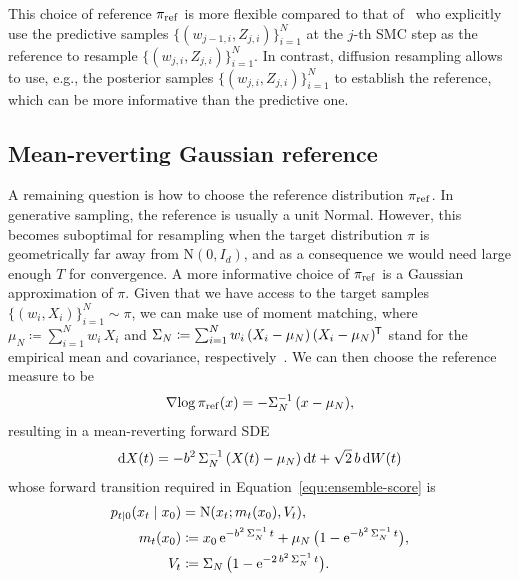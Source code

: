 \documentclass{article}
\begin{document}
This choice of reference $\pi_{\mathrm{ref}}$ is more flexible compared to that of~\citet{Corenflos2021} who explicitly use the predictive samples $\lbrace (w_{j-1, i}, Z_{j, i})\rbrace_{i=1}^N$ at the $j$-th SMC step as the reference to resample $\lbrace (w_{j, i}, Z_{j, i})\rbrace_{i=1}^N$. 
In contrast, diffusion resampling allows to use, e.g., the posterior samples $\lbrace (w_{j, i}, Z_{j, i})\rbrace_{i=1}^N$ to establish the reference, which can be more informative than the predictive one. 

\subsection{Mean-reverting Gaussian reference}
\label{sec:ref-distribution}
A remaining question is how to choose the reference distribution $\pi_{\mathrm{ref}}$.
In generative sampling, the reference is usually a unit Normal. 
However, this becomes suboptimal for resampling when the target distribution $\pi$ is geometrically far away from $\mathrm{N}(0, I_d)$, and as a consequence we would need large enough $T$ for convergence. 
A more informative choice of $\pi_{\mathrm{ref}}$ is a Gaussian approximation of $\pi$. 
Given that we have access to the target samples $\lbrace (w_i, X_i) \rbrace_{i=1}^N \sim \pi$, we can make use of moment matching, where $\mu_N \coloneqq \sum_{i=1}^N w_i \, X_i$ and $\Sigma_N \coloneqq \sum_{i=1}^N w_i \, (X_i - \mu_N) \, (X_i - \mu_N)^{\mkern-1.5mu\mathsf{T}}$ stand for the empirical mean and covariance, respectively~\citep{Yang2013, Kang2025}. 
We can then choose the reference measure to be
%
\begin{equation}
    \begin{split}
        \operatorname{\nabla\!}\log \pi_{\mathrm{ref}}(x) = -\Sigma_N^{-1} \, (x - \mu_N), 
    \end{split}
\end{equation}
%
resulting in a mean-reverting forward SDE
%
\begin{equation}
    \begin{split}
        \mathop{}\!\mathrm{d} X(t) = -b^2 \, \Sigma_N^{-1} \, (X(t) - \mu_N) \mathop{}\!\mathrm{d} t + \sqrt{2} \, b \mathop{}\!\mathrm{d} W(t)
    \end{split}
    \label{equ:gaussian-fwd}
\end{equation}
%
whose forward transition required in Equation~\eqref{equ:ensemble-score} is
%
\begin{equation*}
    \begin{split}
        p_{t|0}(x_t {\;|\;} x_0) &= \mathrm{N}(x_t ; m_t(x_0), V_t), \\
        m_t(x_0) &\coloneqq x_0 \, \mathrm{e}^{-b^2 \, \Sigma_N^{-1} \, t} + \mu_N \, \bigl(1 - \mathrm{e}^{-b^2 \, \Sigma_N^{-1} \, t}\bigr), \\
        V_t &\coloneqq \Sigma_N \, \bigl( 1 - \mathrm{e}^{-2\,b^2 \, \Sigma_N^{-1} \, t} \bigr).
    \end{split}
\end{equation*}
\end{document}
